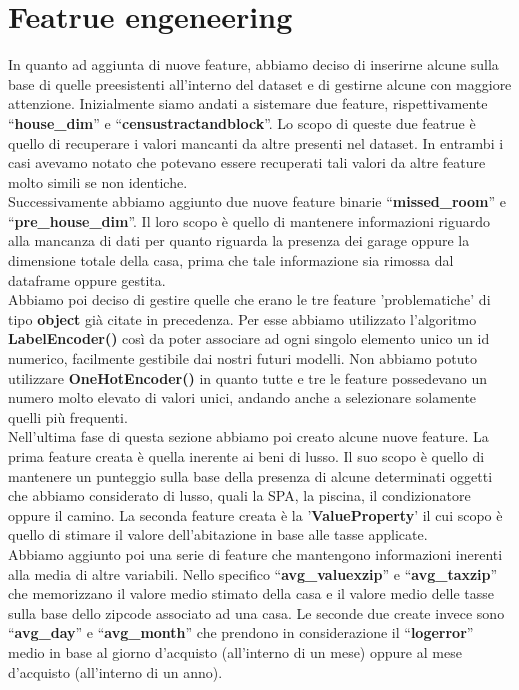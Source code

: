 \section*{Featrue engeneering}
In quanto ad aggiunta di nuove feature, abbiamo deciso di inserirne alcune sulla base di quelle preesistenti all'interno del dataset e di gestirne alcune con maggiore attenzione.
Inizialmente siamo andati a sistemare due feature, rispettivamente ``\textbf{house\_dim}'' e ``\textbf{censustractandblock}''. Lo scopo di queste due featrue è quello di recuperare i valori mancanti da altre presenti nel dataset. In entrambi i casi avevamo notato che potevano essere recuperati tali valori da altre feature molto simili se non identiche.\\
Successivamente abbiamo aggiunto due nuove feature binarie ``\textbf{missed\_room}'' e ``\textbf{pre\_house\_dim}''. Il loro scopo è quello di mantenere informazioni riguardo alla mancanza di dati per quanto riguarda la presenza dei garage oppure la dimensione totale della casa, prima che tale informazione sia rimossa dal dataframe oppure gestita.\\
Abbiamo poi deciso di gestire quelle che erano le tre feature 'problematiche' di tipo \textbf{object} già citate in precedenza. Per esse abbiamo utilizzato l'algoritmo \textbf{LabelEncoder()} così da poter associare ad ogni singolo elemento unico un id numerico, facilmente gestibile dai nostri futuri modelli. Non abbiamo potuto utilizzare \textbf{OneHotEncoder()}
in quanto tutte e tre le feature possedevano un numero molto elevato di valori unici, andando anche a selezionare solamente quelli più frequenti.\\
Nell'ultima fase di questa sezione abbiamo poi creato alcune nuove feature.
La prima feature creata è quella inerente ai beni di lusso. Il suo scopo è quello di mantenere un punteggio sulla base della presenza di alcune determinati oggetti che abbiamo considerato di lusso, quali la SPA, la piscina, il condizionatore oppure il camino.
La seconda feature creata è la '\textbf{ValueProperty}' il cui scopo è quello di stimare il valore dell'abitazione in base alle tasse applicate.\\ 
Abbiamo aggiunto poi una serie di feature che mantengono informazioni inerenti alla media di altre variabili. Nello specifico ``\textbf{avg\_valuexzip}'' e ``\textbf{avg\_taxzip}'' che memorizzano il valore medio stimato della casa e il valore medio delle tasse sulla base dello zipcode associato ad una casa. Le seconde due create invece sono 
``\textbf{avg\_day}'' e ``\textbf{avg\_month}'' che prendono in considerazione il ``\textbf{logerror}'' medio in base al giorno d'acquisto (all'interno di un mese) oppure al mese d'acquisto (all'interno di un anno).\\
